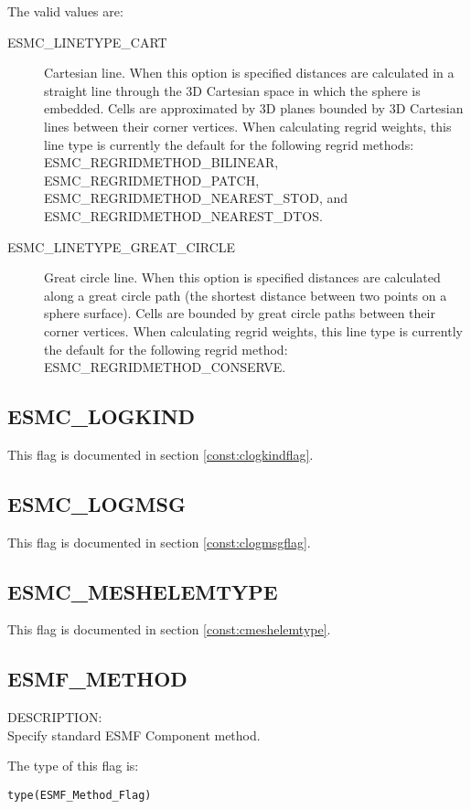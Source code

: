 The valid values are:
\begin{description}
\item [ESMC\_LINETYPE\_CART]
    Cartesian line. When this option is specified distances are calculated in a 
    straight line through the 3D Cartesian space in which the sphere is 
    embedded. Cells are approximated by 3D planes bounded by 3D Cartesian lines 
    between their corner vertices.
    When calculating regrid weights, this line type is currently the default for 
    the following regrid methods: ESMC\_REGRIDMETHOD\_BILINEAR,
    ESMC\_REGRIDMETHOD\_PATCH, ESMC\_REGRIDMETHOD\_NEAREST\_STOD, and 
    ESMC\_REGRIDMETHOD\_NEAREST\_DTOS.
\item [ESMC\_LINETYPE\_GREAT\_CIRCLE]
    Great circle line. When this option is specified distances are calculated 
    along a great circle path (the shortest distance between two points on a 
    sphere surface). Cells are bounded by great circle paths between their 
    corner vertices. When calculating regrid weights, this line type is 
    currently the default for the following regrid method: 
    ESMC\_REGRIDMETHOD\_CONSERVE.
\end{description}


\subsection{ESMC\_LOGKIND}
This flag is documented in section \ref{const:clogkindflag}.

\subsection{ESMC\_LOGMSG}
This flag is documented in section \ref{const:clogmsgflag}.

\subsection{ESMC\_MESHELEMTYPE}
This flag is documented in section \ref{const:cmeshelemtype}.

\subsection{ESMF\_METHOD}
\label{const:cmethod}

{\sf DESCRIPTION:\\}  
Specify standard ESMF Component method.

The type of this flag is:

{\tt type(ESMF\_Method\_Flag)}

